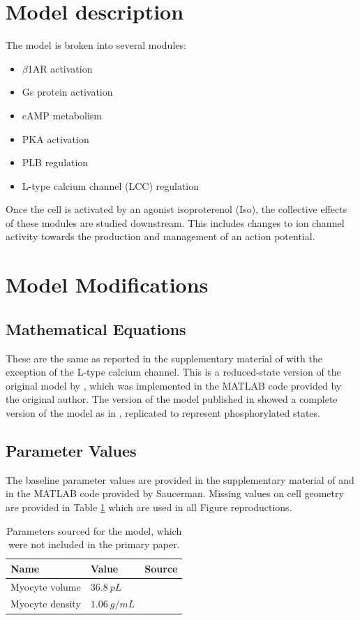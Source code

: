 \documentclass[fleqn,10pt]{physiome}
\begin{document}
\section{Model description}

The model is broken into several modules:
\begin{itemize}
    \item $\beta$1AR activation
    \item Gs protein activation
    \item cAMP metabolism
    \item PKA activation
    \item PLB regulation 
    \item L-type calcium channel (LCC) regulation 
\end{itemize}

Once the cell is activated by an agonist isoproterenol (Iso), the collective effects of these modules are studied downstream. This includes changes to ion channel activity towards the production and management of an action potential.


\section{Model Modifications}

\subsection{Mathematical Equations}
These are the same as reported in the supplementary material of \cite{saucerman2003} with the exception of the L-type calcium channel. 
This is a reduced-state version of the original model by \cite{jafri1998}, which was implemented in the MATLAB code provided by the original author. The version of the model published in \cite{saucerman2003} showed a complete version of the model as in \cite{jafri1998}, replicated to represent phosphorylated states.

\subsection{Parameter Values}
The baseline parameter values are provided in the supplementary material of \cite{saucerman2003} and in the MATLAB code provided by Saucerman. Missing values on cell geometry are provided in Table \ref{tab:parameterMods} which are used in all Figure reproductions. 
\begin{table}[h]
    \centering
    \begin{tabular}{|l|l|l|}
    \hline
    Name & Value & Source\\
    \hline
    Myocyte volume & $36.8\ pL$ & \cite{bers2001}\\
    Myocyte density & $1.06\ g/mL$ & \cite{mendez1960}\\
    \hline
    \end{tabular}
    \caption{Parameters sourced for the model, which were not included in the primary paper.}
    \label{tab:parameterMods}
\end{table}
\end{document}
